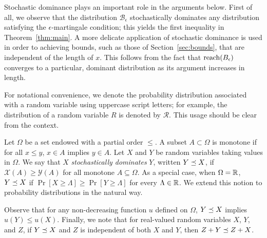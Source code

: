 Stochastic dominance plays an important role in the arguments
below. First of all, we observe that the distribution
$\mathcal{B}_\epsilon$ stochastically dominates any distribution
satisfying the $\epsilon$-martingale condition; this yields the first
inequality in Theorem~\ref{thm:main}. A more delicate application of
stochastic dominance is used in order to achieving bounds, such as
those of Section~\ref{sec:bounds}, that are independent of the length of
$x$. This follows from the fact that $\operatorname{reach}(B_{\epsilon})$ converges to a
particular, dominant distribution as its argument increases in length.

For notational convenience, we denote
the probability distribution associated with a random variable using
uppercase script letters; for example, the distribution of a random
variable $R$ is denoted by $\mathcal{R}$.  This usage should be clear
from the context.


\begin{definition}\label{def:dominance}
  Let $\Omega$ be a set endowed with a partial order $\leq$. A subset
  $A \subset \Omega$ is monotone if for all $x \leq y$, $x \in A$
  implies $y \in A$.  Let $X$ and $Y$ be random variables taking
  values in $\Omega$.
  We say that $X$ \emph{stochastically dominates} $Y$, 
  written $Y \preceq X$, if 
  $
    \mathcal{X}(A) \geq \mathcal{Y}(A)
    $ for all monotone $A \subseteq \Omega$.  As a special case, when
    $\Omega = \mathbb{R}$, $Y \preceq X$ if
    $\Pr[X \geq \Lambda] \geq \Pr[Y \geq \Lambda]$ for every
    $\Lambda \in \mathbb{R}$.  We extend this notion to probability
    distributions in the natural way.
\end{definition}
Observe that for any non-decreasing function $u$ defined on $\Omega$,
$Y \preceq X$ implies $u(Y) \leq u(X)$. Finally, we note that for
real-valued random variables $X$, $Y$, and $Z$, if $Y \preceq X$
and $Z$ is independent of both $X$ and $Y$, then
$Z + Y \preceq Z + X$.

